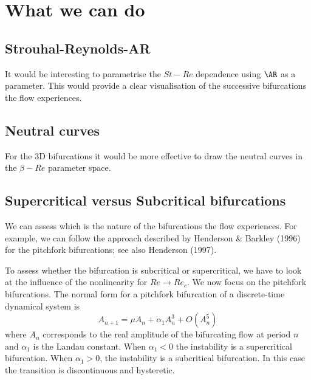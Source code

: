 \section{What we can do}

\subsection{Strouhal-Reynolds-AR}

It would be interesting to parametrise the $St-Re$ dependence using $\AR$ as a parameter. This would provide a clear visualisation of the successive bifurcations the flow experiences.

\subsection{Neutral curves}

For the 3D bifurcations it would be more effective to draw the neutral curves in the $\beta-Re$ parameter space.


\subsection{Supercritical versus Subcritical bifurcations}

We can assess which is the nature of the bifurcations the flow experiences. For example, we can follow the approach described by Henderson \& Barkley (1996) for the pitchfork bifurcations; see also Henderson (1997).

To assess whether the bifurcation is subcritical or supercritical, we have to look at the influence of the nonlinearity for $Re \rightarrow Re_c$. We now focus on the pitchfork bifurcations. The normal form for a pitchfork bifurcation of a discrete-time dynamical system is
%
\begin{equation}
  A_{n+1} = \mu A_n + \alpha_1 A_n^3 + O(A_n^5)
\end{equation}
%
where $A_n$ corresponds to the real amplitude of the bifurcating flow at period $n$ and $\alpha_1$ is the Landau constant. When $\alpha_1<0$ the instability is a supercritical bifurcation. When $\alpha_1>0$, the instability is a subcritical bifurcation. In this case the transition is discontinuous and hysteretic.

